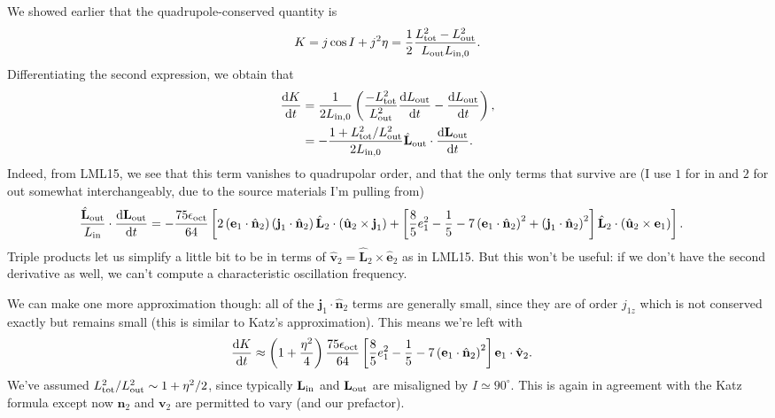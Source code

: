 \documentclass[11pt,
        usenames, %
        dvipsnames %
    ]{article}
\newcommand*{\rd}[2]{\frac{\mathrm{d}#1}{\mathrm{d}#2}}
\newcommand*{\bm}[1]{\boldsymbol{\mathbf{#1}}}
\newcommand*{\uv}[1]{\hat{\bm{#1}}}
\newcommand*{\p}[1]{\left(#1\right)}
\newcommand*{\s}[1]{\left[#1\right]}
\begin{document}
We showed earlier that the quadrupole-conserved quantity is
\begin{equation}
    K = j \cos I + j^2\eta = \frac{1}{2}\frac{L_{\rm tot}^2 - L_{\rm out}^2}{
        L_{\rm out}L_{\rm in, 0}}.
\end{equation}
Differentiating the second expression, we obtain that
\begin{align}
    \rd{K}{t} &= \frac{1}{2L_{\rm in, 0}}
        \p{\frac{-L_{\rm tot}^2}{L_{\rm out}^2} \rd{L_{\rm out}}{t}
            - \rd{L_{\rm out}}{t}},\\
        &= -\frac{1 + L_{\rm tot}^2 / L_{\rm out}^2}{2L_{\rm in, 0}}
            \uv{L}_{\rm out} \cdot \rd{\bm{L}_{\rm out}}{t}.
\end{align}
Indeed, from LML15, we see that this term vanishes to quadrupolar order, and
that the only terms that survive are (I use $1$ for in and $2$ for out somewhat
interchangeably, due to the source materials I'm pulling from)
\begin{align}
    \frac{\uv{L}_{\rm out}}{L_{\rm in}} \cdot \rd{\bm{L}_{\rm out}}{t}
        &= -\frac{75\epsilon_{\rm oct}}{64}\s{
            2\p{\bm{e}_1 \cdot \uv{n}_2}\p{\bm{j}_1 \cdot \uv{n}_2}
                \uv{L}_2 \cdot \p{\uv{u}_2 \times \bm{j}_1}
            + \s{\frac{8}{5}e_1^2 - \frac{1}{5}
                - 7\p{\bm{e}_1 \cdot \uv{n}_2}^2
                + \p{\bm{j}_1 \cdot \uv{n}_2}^2}
                \uv{L}_2 \cdot \p{\uv{u}_2 \times \bm{e}_1}
            }.
\end{align}
Triple products let us simplify a little bit to be in terms of $\uv{v}_2 =
\uv{L}_2 \times \uv{e}_2$ as in LML15. But this won't be useful: if we don't
have the second derivative as well, we can't compute a characteristic
oscillation frequency.

We can make one more approximation though: all of the $\bm{j}_1 \cdot \uv{n}_2$
terms are generally small, since they are of order $j_{1z}$ which is not
conserved exactly but remains small (this is similar to Katz's approximation).
This means we're left with
\begin{align}
    \rd{K}{t}
        &\approx \p{1 + \frac{\eta^2}{4}}
        \frac{75\epsilon_{\rm oct}}{64}
            \s{\frac{8}{5}e_1^2 - \frac{1}{5}
                - 7\p{\bm{e}_1 \cdot \uv{n}_2}^2}
                \bm{e}_1 \cdot \uv{v}_2.
\end{align}
We've assumed $L_{\rm tot}^2 / L_{\rm out}^2 \sim 1 + \eta^2/2$, since typically
$\bm{L}_{\rm in}$ and $\bm{L}_{\rm out}$ are misaligned by $I \simeq 90^\circ$.
This is again in agreement with the Katz formula except now $\bm{n}_2$ and
$\bm{v}_2$ are permitted to vary (and our prefactor).
\end{document}
